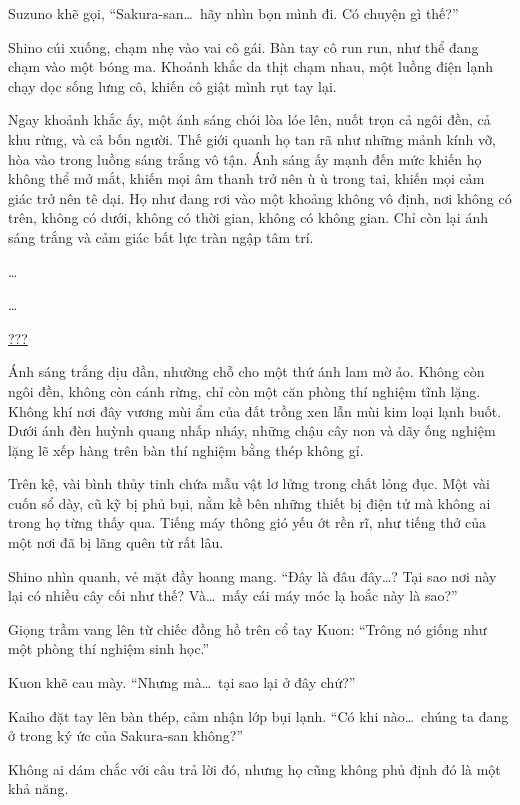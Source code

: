 \documentclass[../main.tex]{subfiles}
\begin{document}
Suzuno khẽ gọi, ``Sakura-san\dots\ hãy nhìn bọn mình đi. Có chuyện gì thế?''

Shino cúi xuống, chạm nhẹ vào vai cô gái. Bàn tay cô run run, như thể đang chạm vào một bóng ma. Khoảnh khắc da thịt chạm nhau, một luồng điện lạnh chạy dọc sống lưng cô, khiến cô giật mình rụt tay lại.

Ngay khoảnh khắc ấy, một ánh sáng chói lòa lóe lên, nuốt trọn cả ngôi đền, cả khu rừng, và cả bốn người. Thế giới quanh họ tan rã như những mảnh kính vỡ, hòa vào trong luồng sáng trắng vô tận. Ánh sáng ấy mạnh đến mức khiến họ không thể mở mắt, khiến mọi âm thanh trở nên ù ù trong tai, khiến mọi cảm giác trở nên tê dại. Họ như đang rơi vào một khoảng không vô định, nơi không có trên, không có dưới, không có thời gian, không có không gian. Chỉ còn lại ánh sáng trắng và cảm giác bất lực tràn ngập tâm trí.

\dots

\dots

\begin{center}
  \uline{???}
\end{center}

Ánh sáng trắng dịu dần, nhường chỗ cho một thứ ánh lam mờ ảo. Không còn ngôi đền, không còn cánh rừng, chỉ còn một căn phòng thí nghiệm tĩnh lặng. Không khí nơi đây vương mùi ẩm của đất trồng xen lẫn mùi kim loại lạnh buốt. Dưới ánh đèn huỳnh quang nhấp nháy, những chậu cây non và dãy ống nghiệm lặng lẽ xếp hàng trên bàn thí nghiệm bằng thép không gỉ.

Trên kệ, vài bình thủy tinh chứa mẫu vật lơ lửng trong chất lỏng đục. Một vài cuốn sổ dày, cũ kỹ bị phủ bụi, nằm kề bên những thiết bị điện tử mà không ai trong họ từng thấy qua. Tiếng máy thông gió yếu ớt rền rĩ, như tiếng thở của một nơi đã bị lãng quên từ rất lâu.


Shino nhìn quanh, vẻ mặt đầy hoang mang. ``Đây là đâu đây\dots? Tại sao nơi này lại có nhiều cây cối như thế? Và\dots\ mấy cái máy móc lạ hoắc này là sao?''

Giọng trầm vang lên từ chiếc đồng hồ trên cổ tay Kuon: ``Trông nó giống như một phòng thí nghiệm sinh học.''

Kuon khẽ cau mày. ``Nhưng mà\dots\ tại sao lại ở đây chứ?''

Kaiho đặt tay lên bàn thép, cảm nhận lớp bụi lạnh. ``Có khi nào\dots\ chúng ta đang ở trong ký ức của Sakura-san không?''

Không ai dám chắc với câu trả lời đó, nhưng họ cũng không phủ định đó là một khả năng.
\end{document}
